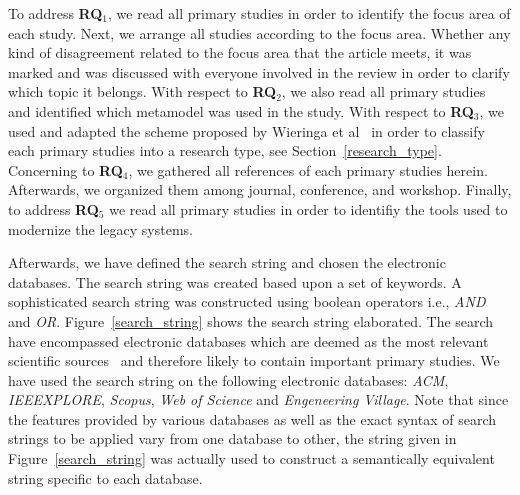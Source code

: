 


To address \textbf{RQ$_1$}, we read all primary studies in order to identify the focus area of each study. Next, we arrange all studies according to the focus area. Whether any kind of disagreement related to the focus area that the article meets, it was marked and was discussed with everyone involved in the review in order to clarify which topic it belongs. With respect to \textbf{RQ$_2$}, we also read all primary studies and identified which metamodel was used in the study. With respect to \textbf{RQ$_3$}, we used and adapted the scheme proposed by Wieringa et al~\cite{Wieringa:2005:REP:1107677.1107683} in order to classify each primary studies into a research type, see Section~\ref{research_type}. Concerning to \textbf{RQ$_4$}, we gathered all references of each primary studies herein. Afterwards, we organized them among journal, conference, and workshop. Finally, to address \textbf{RQ$_5$} we read all primary studies in order to identifiy the tools used to modernize the legacy systems. %


Afterwards, we have defined the search string and chosen the electronic databases. The search string was created based upon a set of keywords. A sophisticated search string was constructed using boolean operators i.e., \textit{AND} and \textit{OR}. Figure~\ref{search_string} shows the search string elaborated. The search have encompassed electronic databases which are deemed as the most relevant scientific sources~\cite{Dyba} and therefore likely to contain important primary studies. We have used the search string on the following electronic databases: \textit{ACM}, \textit{IEEEXPLORE}, \textit{Scopus}, \textit{Web of Science} and \textit{Engeneering Village}. Note that since the features provided by various databases as well as the exact syntax of search strings to be applied vary from one database to other, the string given in Figure~\ref{search_string} was actually used to construct a semantically equivalent string specific to each database.


